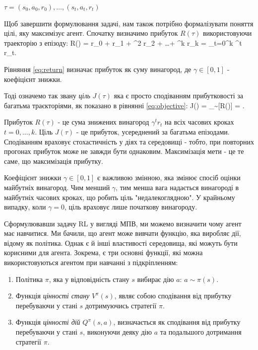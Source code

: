   $\tau = (s_0,a_0,r_0),\dots,(s_t,a_t,r_t)$
  \par Щоб завершити формулювання задачі, нам також потрібно формалізувати поняття цілі, яку максимізує агент. 
  Спочатку визначимо прибуток $R(\tau)$ використовуючи траекторію з епізоду:    R(\tau) = r_0 + \gamma r_1 + \gamma^2 r_2 + \dots + \gamma^{k} r_k = \sum_{t=0}^{k} \gamma^t r_t.\eq
 \par Рівняння \ref{eq:return} визначає прибуток як суму винагород, де $\gamma \in [0,1]$ - коефіцієнт знижки.
 \par Тоді означемо так звану {\em ціль} $J(\tau)$ яка є просто сподіванням прибутковості за багатьма траєкторіями, як показано в рівнянні \ref{eq:objective}:
  J(\tau) = \EX_{\tau \sim \pi}[R(\tau)] = \EX[\sum_{t=0}^{k} \gamma^t r_t]. \eq
 \par Прибуток $R(\tau)$ - це сума знижених винагород $\gamma^t r_t$ на всіх часових кроках $t = 0,\dots,k$. Ціль $J(\tau)$ - це 
 прибуток, усереднений за багатьма епізодами. Сподіванням враховує стохастичність у діях та середовищі - тобто, 
 при повторних прогонах прибуток може не завжди бути однаковим. Максимізація мети - це те саме, що максимізація прибутку.
\par Коефіцієнт знижки $\gamma \in [0,1]$ є важливою змінною, яка змінює спосіб оцінки майбутніх винагород. Чим менший $\gamma$, 
  тим менша вага надається винагороді в майбутніх часових кроках, що робить ціль "недалекоглядною". 
  У крайньому випадку, коли $\gamma = 0$, ціль враховує лише початкову винагороду.
  \\ \par Сформулювавши задачу RL у вигляді МПВ, ми можемо визначити чому агент має навчитися.
  Ми бачили, що агент може вивчати функцію, яка виробляє дії, відому як політика. Однак є й інші 
  властивості середовища, які можуть бути корисними для агента. Зокрема, є три основні функції, 
  які можна використовуються агентом при навчанні з підкріпленням:
  \begin{enumerate}
    \item Політика $\pi$, яка у відповідність стану $s$ вибирає дію $a$: $a \sim \pi(s)$. \label{item:policy}
    \item Функція {\em цінності стану} $V^{\pi}(s)$, являє собою сподівання від прибутку перебуваючи у стані $s$ 
    дотримуючись стратегії $\pi$. \label{item:value}
    \item Функція {\em цінності дій} $Q^{\pi}(s,a)$, визначається як сподівання від прибутку перебуваючи у 
    стані $s$, виконуючи деяку дію $a$ та подальшого дотримання стратегії $\pi$. \label{item:action_value}
\end{enumerate}
